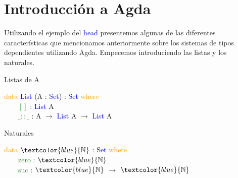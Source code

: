 \documentclass[xcolor=dvipsnames]{beamer} %
\newcommand{\cf}[1]{\textcolor{blue}{#1}}
\newcommand{\ct}[1]{\textcolor{blue}{#1}}
\newcommand{\cc}[1]{\textcolor{ForestGreen}{#1}}
\newcommand{\ck}[1]{\textcolor{orange}{#1}}
\newcommand{\N}{\ct{\mathbb{N}}}
\newcommand{\ra}{\rightarrow}
\newcommand{\T}{ \ \ \ \ }
\begin{document}
\section{Introducción a Agda}

\begin{frame}

\begin{block}{}
Utilizando el ejemplo del \cf{head} presentemos algunas de las diferentes características
que mencionamos anteriormente sobre los sistemas de tipos dependientes utilizando Agda.
Empecemos introduciendo las listas y los naturales.
\end{block}

\pause

\begin{block}{Listas de A}

\ck{data} \ct{List} (A : \ct{Set}) : \ct{Set} \ck{where}\\
\T \cc{$[]$} : \ct{List} A\\
\T \cc{$\_::\_$} : A $\ra$ \ct{List} A $\ra$ \ct{List} A

\end{block}

\pause

\begin{block}{Naturales}

\ck{data} $\N$ : \ct{Set} \ck{where}\\
\T \cc{zero} : $\N$\\
\T \cc{suc}  : $\N$ $\ra$ $\N$

\end{block}

\end{frame}
\end{document}
